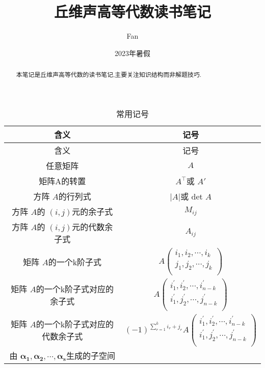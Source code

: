 \documentclass[a4paper,11pt]{article}%
\author{Fan}
\title{丘维声高等代数读书笔记}
\date{2023年暑假}
\theoremstyle{remark}
\theoremstyle{definition}
\theoremstyle{definition}
\theoremstyle{plain}
\begin{document}
\maketitle
\tableofcontents
\begin{abstract}
    本笔记是丘维声高等代数的读书笔记,主要关注知识结构而非解题技巧.    
\end{abstract}
\pagestyle{plain}%
\begin{longtable}{cc}
       \caption{常用记号} \\
       \multicolumn{1}{c}{含义}&\multicolumn{1}{c}{记号}\\
       \hline
       \endfirsthead
       \multicolumn{1}{c}{含义}&\multicolumn{1}{c}{记号}\\
       \hline\endhead
       任意矩阵&$A$\\
       矩阵A的转置&$A^{\top}$或 $A'$\\
       方阵 $A$的行列式&$\lvert A\rvert$或 det $A$\\
       方阵 $A$的 $(i,j)$元的余子式& $M_{ij}$\\
       方阵 $A$的 $(i,j)$元的代数余子式& $A_{ij}$\\
       矩阵 $A$的一个k阶子式 & 
        $A
        \begin{pmatrix}
        i_1,i_2,\cdots,i_k\\
        j_1,j_2,\cdots,j_k\\    
        \end{pmatrix}$
       \\
       矩阵 $A$的一个k阶子式对应的余子式 &
       $A
       \begin{pmatrix}
        i_1^{\prime},i_2^{\prime},\cdots,i_{n-k}^{\prime}\\
        i_1^{\prime},j_2^{\prime},\cdots,j_{n-k}^{\prime}\\
       \end{pmatrix}
       $
       \\
        矩阵 $A$的一个k阶子式对应的代数余子式 &
       $(-1)^{\sum_{r=1}^{k}{i_r+j_r}}A
       \begin{pmatrix}
        i_1^{\prime},i_2^{\prime},\cdots,i_{n-k}^{\prime}\\
        i_1^{\prime},j_2^{\prime},\cdots,j_{n-k}^{\prime}\\
       \end{pmatrix}
       $\\
       由 $\bm{\alpha_1},\bm{\alpha_2},\cdots,\bm{\alpha_s}$生成的子空间&

\end{longtable}
\end{document}
